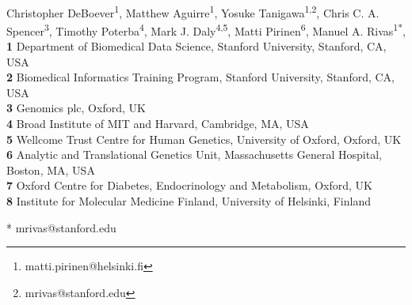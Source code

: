 
\usepackage{float}

\newcommand{\lorem}{{\bf LOREM}}
\newcommand{\ipsum}{{\bf IPSUM}}

\def\bs{\boldsymbol}
\def\Vy{\widehat{\textrm{V}}_Y}



\vspace*{0.2in}

\begin{flushleft}
{\Large
\textbf{} %
}
\newline
\\
\author{Christopher DeBoever$^{1}$, Matthew Aguirre$^{1}$, Yosuke Tanigawa$^{1}$, Chris C. A. Spencer$^{2}$, Timothy Poterba$^{3}$, Mark J. Daly$^{3,4}$,  Matti Pirinen$^{5}$\thanks{matti.pirinen@helsinki.fi}, and Manuel A. Rivas$^{1}$\thanks{mrivas@stanford.edu}}
Christopher DeBoever\textsuperscript{1},
Matthew Aguirre\textsuperscript{1},
Yosuke Tanigawa\textsuperscript{1,2},
Chris C. A. Spencer\textsuperscript{3},
Timothy Poterba\textsuperscript{4},
Mark J. Daly\textsuperscript{4,5},
Matti Pirinen\textsuperscript{6},
Manuel A. Rivas\textsuperscript{1*},
\\
\bigskip
\textbf{1} Department of Biomedical Data Science, Stanford University, Stanford, CA, USA
\\
\textbf{2} Biomedical Informatics Training Program, Stanford University, Stanford, CA, USA
\\
\textbf{3} Genomics plc, Oxford, UK
\\
\textbf{4} Broad Institute of MIT and Harvard, Cambridge, MA, USA
\\
\textbf{5} Wellcome Trust Centre for Human Genetics, University of Oxford, Oxford, UK
\\
\textbf{6} Analytic and Translational Genetics Unit, Massachusetts General Hospital, Boston, MA, USA
\\
\textbf{7} Oxford Centre for Diabetes, Endocrinology and Metabolism, Oxford, UK
\\
\textbf{8} Institute for Molecular Medicine Finland, University of Helsinki, Finland
\\
\bigskip

* mrivas@stanford.edu

\end{flushleft}
